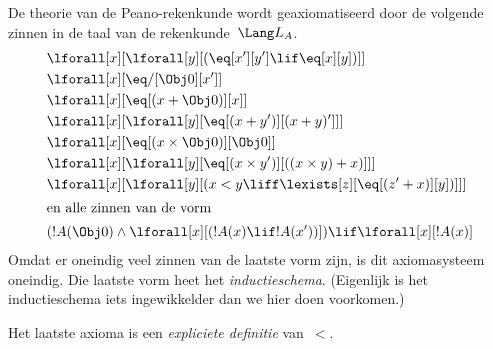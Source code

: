 \documentclass[openany]{memoir}
\begin{document}
\begin{ex}
De theorie van de Peano-rekenkunde wordt geaxiomatiseerd door de
volgende zinnen in de taal van de rekenkunde~$\Lang L_A$.
\begin{align*}
& \lforall[x][\lforall[y][(\eq[x'][y'] \lif \eq[x][y])]]\\
& \lforall[x][\eq/[\Obj 0][x']]\\
& \lforall[x][\eq[(x + \Obj 0)][x]]\\
& \lforall[x][\lforall[y][\eq[(x + y')][(x + y)']]]\\
& \lforall[x][\eq[(x \times \Obj 0)][\Obj 0]]\\
& \lforall[x][\lforall[y][\eq[(x \times y')][((x \times y) + x)]]]\\
& \lforall[x][\lforall[y][(x < y \liff \lexists[z][\eq[(z' + x)][y])]]]\\
\intertext{en alle zinnen van de vorm}
& (!A(\Obj 0) \land \lforall[x][(!A(x) \lif !A(x'))]) \lif \lforall[x][!A(x)]
\end{align*}
Omdat er oneindig veel zinnen van de laatste vorm zijn, is dit
axiomasysteem oneindig. Die laatste vorm heet het
\emph{inductieschema}. (Eigenlijk is het inductieschema iets
ingewikkelder dan we hier doen voorkomen.)

Het laatste axioma is een \emph{expliciete definitie} van~$<$.
\end{ex}
\end{document}
